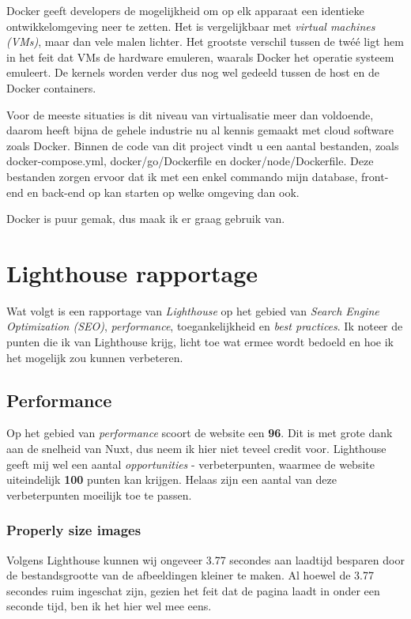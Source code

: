 \documentclass[a4paper]{report}
\begin{document}
    Docker geeft developers de mogelijkheid om op elk apparaat een identieke ontwikkelomgeving neer te zetten. Het is vergelijkbaar met \textit{virtual machines (VMs)}, maar dan
    vele malen lichter. Het grootste verschil tussen de twéé ligt hem in het feit dat VMs de hardware emuleren, waarals Docker het operatie systeem emuleert. De kernels worden
    verder dus nog wel gedeeld tussen de host en de Docker containers.

    Voor de meeste situaties is dit niveau van virtualisatie meer dan voldoende, daarom heeft bijna de gehele industrie nu al kennis gemaakt met cloud software zoals Docker.
    Binnen de code van dit project vindt u een aantal bestanden, zoals {\selectfont docker-compose.yml, docker/go/Dockerfile} en
    {\selectfont docker/node/Dockerfile}. Deze bestanden zorgen ervoor dat ik met een enkel commando mijn database, front-end en back-end op kan starten op welke omgeving dan ook.

    Docker is puur gemak, dus maak ik er graag gebruik van.

    \chapter{Lighthouse rapportage}
    Wat volgt is een rapportage van \textit{Lighthouse} op het gebied van \textit{Search Engine Optimization (SEO)},
    \textit{performance}, toegankelijkheid en \textit{best practices}.
    Ik noteer de punten die ik van Lighthouse krijg, licht toe wat ermee wordt bedoeld en hoe ik het mogelijk zou kunnen verbeteren.

    \section{Performance}
    Op het gebied van \textit{performance} scoort de website een \textbf{96}.
    Dit is met grote dank aan de snelheid van Nuxt, dus neem ik hier niet teveel credit voor.
    Lighthouse geeft mij wel een aantal \textit{opportunities} - verbeterpunten, waarmee de website uiteindelijk \textbf{100} punten kan krijgen.
    Helaas zijn een aantal van deze verbeterpunten moeilijk toe te passen.

    \subsection{Properly size images}
    Volgens Lighthouse kunnen wij ongeveer 3.77 secondes aan laadtijd besparen door de bestandsgrootte van de afbeeldingen kleiner te maken.
    Al hoewel de 3.77 secondes ruim ingeschat zijn, gezien het feit dat de pagina laadt in onder een seconde tijd, ben ik het hier wel mee eens.
\end{document}
